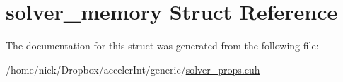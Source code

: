 \hypertarget{structsolver__memory}{}\section{solver\+\_\+memory Struct Reference}
\label{structsolver__memory}


The documentation for this struct was generated from the following file\+:\begin{DoxyCompactItemize}
\item 
/home/nick/\+Dropbox/acceler\+Int/generic/\hyperlink{solver__props_8cuh}{solver\+\_\+props.\+cuh}\end{DoxyCompactItemize}
